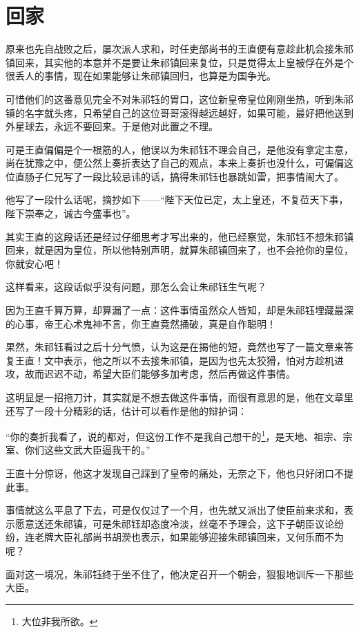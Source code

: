 \section{回家}
\ifnum{}
	\begin{multicols}{\theparacolNo}
\fi
原来也先自战败之后，屡次派人求和，时任吏部尚书的王直便有意趁此机会接朱祁镇回来，其实他的本意并不是要让朱祁镇回来复位，只是觉得太上皇被俘在外是个很丢人的事情，现在如果能够让朱祁镇回归，也算是为国争光。

可惜他们的这番意见完全不对朱祁钰的胃口，这位新皇帝皇位刚刚坐热，听到朱祁镇的名字就头疼，只希望自己的这位哥哥滚得越远越好，如果可能，最好把他送到外星球去，永远不要回来。于是他对此置之不理。

可是王直偏偏是个一根筋的人，他误以为朱祁钰不理会自己，是他没有拿定主意，尚在犹豫之中，便公然上奏折表达了自己的观点，本来上奏折也没什么，可偏偏这位直肠子仁兄写了一段比较忌讳的话，搞得朱祁钰也暴跳如雷，把事情闹大了。

他写了一段什么话呢，摘抄如下——“陛下天位已定，太上皇还，不复莅天下事，陛下崇奉之，诚古今盛事也”。

其实王直的这段话还是经过仔细思考才写出来的，他已经察觉，朱祁钰不想朱祁镇回来，就是因为皇位，所以他特别声明，就算朱祁镇回来了，也不会抢你的皇位，你就安心吧！

这样看来，这段话似乎没有问题，那怎么会让朱祁钰生气呢？

因为王直千算万算，却算漏了一点：这件事情虽然众人皆知，却是朱祁钰埋藏最深的心事，帝王心术鬼神不言，你王直竟然捅破，真是自作聪明！

果然，朱祁钰看过之后十分气愤，认为这是在揭他的短，竟然也写了一篇文章来答复王直！文中表示，他之所以不去接朱祁镇，是因为也先太狡猾，怕对方趁机进攻，故而迟迟不动，希望大臣们能够多加考虑，然后再做这件事情。

这明显是一招拖刀计，其实就是不想去做这件事情，而很有意思的是，他在文章里还写了一段十分精彩的话，估计可以看作是他的辩护词：

“你的奏折我看了，说的都对，但这份工作不是我自己想干的\footnote{大位非我所欲。}，是天地、祖宗、宗室、你们这些文武大臣逼我干的。”

王直十分惊讶，他这才发现自己踩到了皇帝的痛处，无奈之下，他也只好闭口不提此事。

事情就这么平息了下去，可是仅仅过了一个月，也先就又派出了使臣前来求和，表示愿意送还朱祁镇，可是朱祁钰却态度冷淡，丝毫不予理会，这下子朝臣议论纷纷，连老牌大臣礼部尚书胡濙也表示，如果能够迎接朱祁镇回来，又何乐而不为呢？

面对这一境况，朱祁钰终于坐不住了，他决定召开一个朝会，狠狠地训斥一下那些大臣。


\end{multicols}
